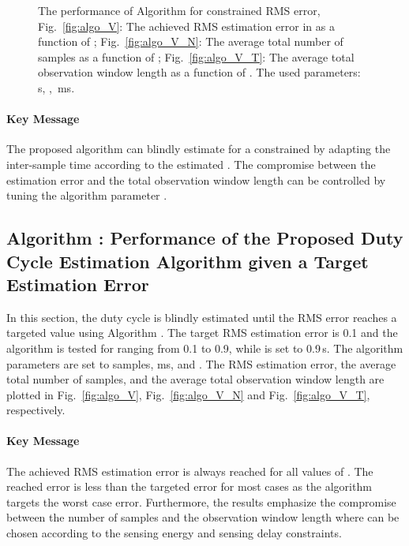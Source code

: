 \documentclass[11pt,draftclsnofoot,journal,onecolumn]{IEEEtran}
\begin{document}
\begin{figure*}
\centering
{}
\caption{The performance of Algorithm  for constrained RMS error, Fig.~\ref{fig:algo_V}: The achieved RMS estimation error in  as a function of ; Fig.~\ref{fig:algo_V_N}: The average total number of samples as a function of ; Fig.~\ref{fig:algo_V_T}: The average total observation window length as a function of . The used parameters: \,s, , \,ms.}
\end{figure*}

\paragraph*{Key Message}

The proposed algorithm can blindly estimate  for a constrained  by adapting the inter-sample time according to the estimated . The compromise between the estimation error and the total observation window length can be controlled by tuning the algorithm parameter .

\subsection{Algorithm : Performance of the Proposed Duty Cycle Estimation Algorithm given a Target Estimation Error}
\label{sec:algorithm_numerical_cons_V}

In this section, the duty cycle is blindly estimated until the RMS error reaches a targeted value using Algorithm . The target RMS estimation error is 0.1 and the algorithm is tested for  ranging from 0.1 to 0.9, while  is set to 0.9\,s. The algorithm parameters are set to  samples,  ms, and . The RMS estimation error, the average total number of samples, and the average total observation window length are plotted in Fig.~\ref{fig:algo_V}, Fig.~\ref{fig:algo_V_N} and Fig.~\ref{fig:algo_V_T}, respectively.

\paragraph*{Key Message}

The achieved RMS estimation error is always reached for all values of . The reached error is less than the targeted error for most cases as the algorithm targets the worst case error. Furthermore, the results emphasize the compromise between the number of samples and the observation window length where  can be chosen according to the sensing energy and sensing delay constraints.
\end{document}
